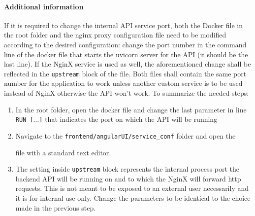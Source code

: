 \documentclass{scrreprt}
\begin{document}
\paragraph{Additional information}
If it is required to change the internal API service port, both the Docker file in the root folder and the nginx proxy configuration file need to be modified according to the desired configuration: change the port number in the command line of the docker file that starts the uvicorn server for the API (it should be the last line). If the NginX service is used as well, the aforementioned change shall be reflected in the \texttt{upstream} block of the \proxy \space file. Both files shall contain the same port number for the application to work unless another custom service is to be used instead of NginX otherwise the API won't work. To summarize the needed steps:
\begin{enumerate}
	\item In the root folder, open the docker file and change the last parameter in line \texttt{RUN [$\dots$]} that indicates the port on which the API will be running
	\item Navigate to the \texttt{frontend/angularUI/service\_conf} folder and open the 
	
	\proxy \space file with a standard text editor.
	\item The setting inside \texttt{upstream} block represents the internal process port the backend API will be running on and to which the NginX will forward http requests. This is not meant to be exposed to an external user necessarily and it is for internal use only. Change the parameters to be identical to the choice made in the previous step.
\end{enumerate}
\end{document}
